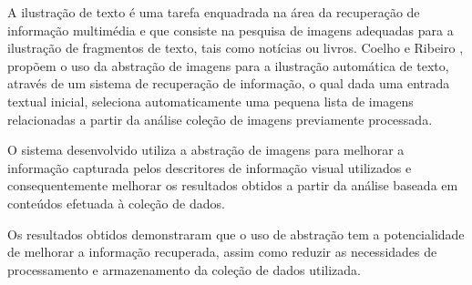 A ilustração de texto é uma tarefa enquadrada na área da recuperação de informação multimédia e que consiste na pesquisa de imagens adequadas para a ilustração de fragmentos de texto, tais como notícias ou livros. Coelho e Ribeiro  \cite{Coelho:2012:IAC:2260641.2260676}, propõem o uso da abstração de imagens para a ilustração automática de texto, através de um sistema de recuperação de informação, o qual dada uma entrada textual inicial, seleciona automaticamente uma pequena lista de imagens relacionadas a partir da análise coleção de imagens previamente processada.

O sistema desenvolvido utiliza a abstração de imagens para melhorar a informação capturada pelos descritores de informação visual utilizados e consequentemente melhorar os resultados obtidos a partir da análise baseada em conteúdos efetuada à coleção de dados.

Os resultados obtidos demonstraram que o uso de abstração tem a potencialidade de melhorar a informação recuperada, assim como reduzir as necessidades de processamento e armazenamento da coleção de dados utilizada.